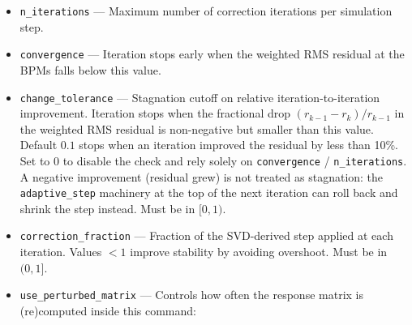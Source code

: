 \documentclass[11pt]{article}
\begin{document}
\begin{itemize}
  Each entry of the list defines one family group: every knob whose
  element name matches that entry is placed in a single group and
  receives the same $\Delta K$ from the SVD solver, which is applied
  identically to every member of the group.  Knobs whose names do not
  match any entry remain independent, one SVD column each.  A knob
  matched by multiple entries is placed in the earliest-listed match
  (first match wins).  Example: \verb|bind_name_pattern = "*Q1 *Q2 *Q3"|
  collapses every element ending in \verb|Q1|, every element ending in
  \verb|Q2|, and every element ending in \verb|Q3| into three bound
  family knobs (rather than three groups per distinct name); this is
  the natural way to enforce family symmetry across a periodic ring
  whose elements have per-sector unique names (\verb|S1:Q1|,
  \verb|S2:Q1|, ..., \verb|S40:Q1|).
  Precedence: if a prior \verb|compute_lattice_response_matrix| or
  \verb|load_lattice_response_matrix| already supplied a binding (the
  matrix file records the pattern as a \verb|BindNamePattern| parameter),
  the value on \verb|correct_lattice| {\em overrides} it when given and
  is inherited when omitted (\verb|NULL|).  With no preloaded binding
  and \verb|NULL| here, every knob is independent.
\item \verb|n_iterations| --- Maximum number of correction iterations per
  simulation step.
\item \verb|convergence| --- Iteration stops early when the weighted RMS
  residual at the BPMs falls below this value.
\item \verb|change_tolerance| --- Stagnation cutoff on relative
  iteration-to-iteration improvement.  Iteration stops when the
  fractional drop $(r_{k-1} - r_k)/r_{k-1}$ in the weighted RMS residual
  is non-negative but smaller than this value.  Default $0.1$ stops
  when an iteration improved the residual by less than 10\%.  Set to 0
  to disable the check and rely solely on \verb|convergence| /
  \verb|n_iterations|.  A negative improvement (residual grew) is not
  treated as stagnation: the \verb|adaptive_step| machinery at the top
  of the next iteration can roll back and shrink the step instead.
  Must be in $[0, 1)$.
\item \verb|correction_fraction| --- Fraction of the SVD-derived step
  applied at each iteration.  Values $<1$ improve stability by avoiding
  overshoot.  Must be in $(0,1]$.
\item \verb|use_perturbed_matrix| --- Controls how often the response
  matrix is (re)computed inside this command:
  \begin{itemize}

\end{itemize}
\end{itemize}
\end{document}
